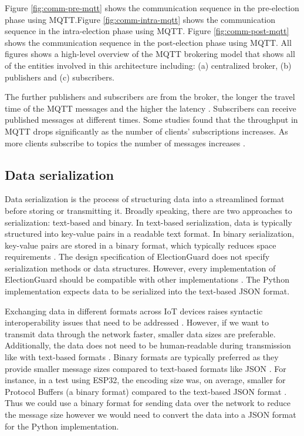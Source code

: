 Figure \ref{fig:comm-pre-mqtt} shows the communication sequence in the pre-election phase using MQTT.Figure \ref{fig:comm-intra-mqtt} shows the communication sequence in the intra-election phase using MQTT. Figure \ref{fig:comm-post-mqtt} shows the communication sequence in the post-election phase using MQTT. All figures shows a high-level overview of the MQTT brokering model that shows all of the entities involved in this architecture including: (a) centralized broker, (b) publishers and (c) subscribers.  

The further publishers and subscribers are from the broker, the longer the travel time of the MQTT messages and the higher the latency \cite[20]{protocols}. Subscribers can receive published messages at different times. Some studies found that the throughput in MQTT drops significantly as the number of clients’ subscriptions increases. As more clients subscribe to topics the number of messages increases \cite[19,21,22]{protocols}.

\subsection{Data serialization}
Data serialization is the process of structuring data into a streamlined format before storing or transmitting it. Broadly speaking, there are two approaches to serialization: text-based and binary. In text-based serialization, data is typically structured into key-value pairs in a readable text format. In binary serialization, key-value pairs are stored in a binary format, which typically reduces space requirements \cite[11]{serialisation}. The design specification of ElectionGuard does not specify serialization methods or data structures. However, every implementation of ElectionGuard should be compatible with other implementations \cite[23]{eg-paper}. The Python implementation expects data to be serialized into the text-based JSON format.

Exchanging data in different formats across IoT devices raises syntactic interoperability issues that need to be addressed \cite[17]{protocols}. However, if we want to transmit data through the network faster, smaller data sizes are preferable. Additionally, the data does not need to be human-readable during transmission like with text-based formats \cite[225]{protobuffer}. Binary formats are typically preferred as they provide smaller message sizes compared to text-based formats like JSON \cite[11]{serialisation}. For instance, in a test using ESP32, the encoding size was, on average, smaller for Protocol Buffers (a binary format) compared to the text-based JSON format \cite[15]{serialisation-comparison}. Thus we could use a binary format for sending data over the network to reduce the message size however we would need to convert the data into a JSON format for the Python implementation. 


